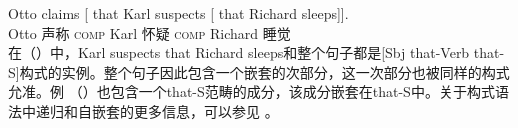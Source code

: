 
\ea
\gll Otto claims [ that Karl suspects [ that Richard sleeps]].\\
	Otto 声称 {} \textsc{comp} Karl 怀疑 {} \textsc{comp} Richard 睡觉\\
\z
在（）中，Karl suspects that Richard sleeps和整个句子都是[Sbj that-Verb that-S]构式的实例。整个句子因此包含一个嵌套的次部分，这一次部分也被同样的构式允准。例 （）也包含一个that-S范畴的成分，该成分嵌套在that-S中。关于构式语法中递归和自嵌套的更多信息，可以参见 。

